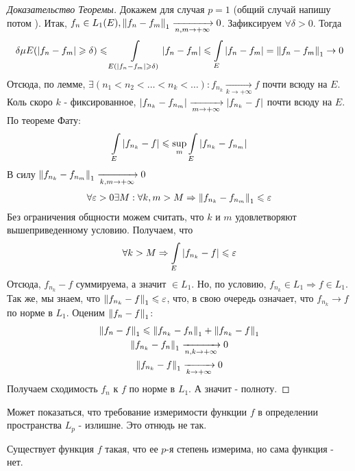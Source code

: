 \newpage

\begin{proof}[Доказательство Теоремы]
	Докажем для случая $p = 1$ (общий случай напишу потом \todo).
	Итак, $f_n \in L_1(E), \left\|f_n - f_m\right\|_{1} \xrightarrow[n,m \rightarrow +\infty]{} 0$. Зафиксируем $\forall\delta > 0$. 
	Тогда 
	\begin{gather*}
		\delta\mu E(\left|f_n - f_m\right| \geqslant \delta) \leqslant 
		\int\limits_{E(\left|f_n - f_m\right| \geqslant \delta)} \left|f_n - f_m\right| \leqslant \int\limits_{E} \left|f_n - f_m\right| = \left\|f_n - f_m\right\|_{1}
		\rightarrow 0
	\end{gather*}
	Отсюда, по лемме, $\exists(n_1 < n_2 < \dots < n_k < \dots) : f_{n_k} \xrightarrow[k \rightarrow +\infty]{} f$ почти всюду на $E$.
	Коль скоро $k$ - фиксированное, $\left|f_{n_k} - f_{n_m}\right| \xrightarrow[m \rightarrow +\infty]{} \left|f_{n_k} - f\right|$ почти всюду на $E$.
	По теореме Фату:
	\begin{gather*}
		\int\limits_{E}\left|f_{n_k} - f\right| \leqslant \sup\limits_{m}\int\limits_{E} \left|f_{n_k} - f_{n_m}\right|
	\end{gather*}
	В силу $\left\|f_{n_k} - f_{n_m}\right\|_{1}\xrightarrow[k,m \rightarrow +\infty]{} 0$
	\begin{gather*}
		\forall\varepsilon>0\exists M : \forall k, m > M \Rightarrow \left\|f_{n_k} - f_{n_m}\right\|_{1}\leqslant \varepsilon
	\end{gather*}
	Без ограничения общности можем считать, что $k$ и $m$ удовлетворяют вышеприведенному условию.
	Получаем, что 
	\begin{gather*}
		\forall k > M \Rightarrow \int\limits_{E} \left|f_{n_k} - f\right| \leqslant \varepsilon
	\end{gather*}
	Отсюда, $f_{n_k} - f$ суммируема, а значит $\in L_1$. Но, по условию, $f_{n_k} \in L_1 \Rightarrow f \in L_1$. 
	Так же, мы знаем, что $\left\|f_{n_k} - f\right\|_{1} \leqslant \varepsilon$, что, в свою очередь означает, что $f_{n_k} \rightarrow f$ по норме в $L_1$.
	Оценим $\left\|f_n - f\right\|_{1}$:
	\begin{gather*}
		\left\|f_n - f\right\|_{1} \leqslant \left\|f_{n_k} - f_n\right\|_{1} + \left\|f_{n_k} - f\right\|_{1} \\
		\left\|f_{n_k} - f_n\right\|_{1} \xrightarrow[n,k \rightarrow +\infty]{} 0 \\
		\left\|f_{n_k} - f\right\|_{1}   \xrightarrow[k \rightarrow +\infty]{} 0
	\end{gather*}
	Получаем сходимость $f_n$ к $f$ по норме в $L_1$. А значит - полноту.
\end{proof}

Может показаться, что требование измеримости функции $f$ в определении пространства $L_p$ -  излишне. Это отнюдь не так.
\begin{statement}
	Существует функция $f$ такая, что ее $p$-я степень измерима, но сама функция - нет. 
\end{statement}

